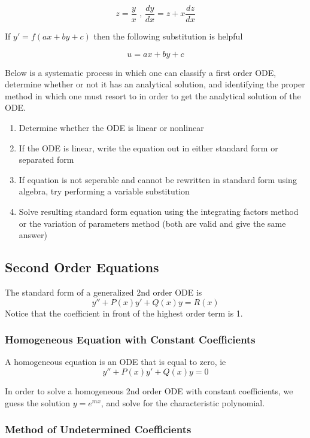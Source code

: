 \documentclass{article}
\begin{document}
$$ z = \frac{y}{x} \text{ , } \frac{dy}{dx} = z + x\frac{dz}{dx} $$

If $ y' = f(ax + by + c) $ then the following substitution is helpful 

$$ u = ax + by + c $$

Below is a systematic process in which one can classify a first order ODE, determine whether or not it has an analytical solution, and identifying the proper method in which one must resort to in order to get the analytical solution of the ODE. 

\begin{enumerate}
    \item Determine whether the ODE is linear or nonlinear
    \item If the ODE is linear, write the equation out in either standard form or separated form
    \item If equation is not seperable and cannot be rewritten in standard form using algebra, try performing a variable substitution
    \item Solve resulting standard form equation using the integrating factors method or the variation of parameters method (both are valid and give the same answer)
    
\end{enumerate}


\subsection{Second Order Equations}

The standard form of a generalized 2nd order ODE is 
$$ y'' + P(x)y' + Q(x)y = R(x) $$
Notice that the coefficient in front of the highest order term is 1. 

\subsubsection{Homogeneous Equation with Constant Coefficients}

A homogeneous equation is an ODE that is equal to zero, ie $$y'' +P(x)y' + Q(x)y = 0$$

In order to solve a homogeneous 2nd order ODE with constant coefficients, we guess the solution $y = e^{mx}$, and solve for the characteristic polynomial.


\subsubsection{Method of Undetermined Coefficients}
\end{document}
